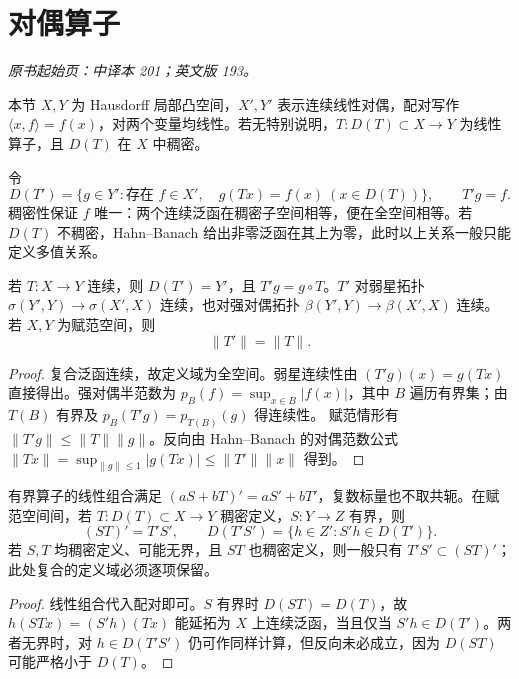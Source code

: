 \section{对偶算子}\label{sec:yosida-07-01}
\noindent\textit{原书起始页：中译本 201；英文版 193。}

本节 $X,Y$ 为 Hausdorff 局部凸空间，$X',Y'$ 表示连续线性对偶，配对写作 $\langle x,f\rangle=f(x)$，对两个变量均线性。若无特别说明，$T:D(T)\subset X\to Y$ 为线性算子，且 $D(T)$ 在 $X$ 中稠密。

\begin{definition}[对偶算子及其定义域]
令
\[
 D(T')=\{g\in Y':\text{存在 }f\in X',\quad g(Tx)=f(x)\ (x\in D(T))\},
 \qquad T'g=f.
\]
稠密性保证 $f$ 唯一：两个连续泛函在稠密子空间相等，便在全空间相等。若 $D(T)$ 不稠密，Hahn--Banach 给出非零泛函在其上为零，此时以上关系一般只能定义多值关系。
\end{definition}

\begin{proposition}[连续算子的转置]\label{prop:y7-transpose}
若 $T:X\to Y$ 连续，则 $D(T')=Y'$，且 $T'g=g\circ T$。$T'$ 对弱星拓扑 $\sigma(Y',Y)\to\sigma(X',X)$ 连续，也对强对偶拓扑 $\beta(Y',Y)\to\beta(X',X)$ 连续。若 $X,Y$ 为赋范空间，则
\[
 \|T'\|=\|T\|.
\]
\end{proposition}
\begin{proof}
复合泛函连续，故定义域为全空间。弱星连续性由 $(T'g)(x)=g(Tx)$ 直接得出。强对偶半范数为 $p_B(f)=\sup_{x\in B}|f(x)|$，其中 $B$ 遍历有界集；由 $T(B)$ 有界及 $p_B(T'g)=p_{T(B)}(g)$ 得连续性。
赋范情形有 $\|T'g\|\le\|T\|\|g\|$。反向由 Hahn--Banach 的对偶范数公式
$\|Tx\|=\sup_{\|g\|\le1}|g(Tx)|\le\|T'\|\|x\|$ 得到。
\end{proof}

\begin{proposition}[代数运算的定义域]
有界算子的线性组合满足 $(aS+bT)'=aS'+bT'$，复数标量也不取共轭。在赋范空间间，若 $T:D(T)\subset X\to Y$ 稠密定义，$S:Y\to Z$ 有界，则
\[
 (ST)'=T'S',\qquad D(T'S')=\{h\in Z':S'h\in D(T')\}.
\]
若 $S,T$ 均稠密定义、可能无界，且 $ST$ 也稠密定义，则一般只有 $T'S'\subset(ST)'$；此处复合的定义域必须逐项保留。
\end{proposition}
\begin{proof}
线性组合代入配对即可。$S$ 有界时 $D(ST)=D(T)$，故 $h(STx)=(S'h)(Tx)$ 能延拓为 $X$ 上连续泛函，当且仅当 $S'h\in D(T')$。两者无界时，对 $h\in D(T'S')$ 仍可作同样计算，但反向未必成立，因为 $D(ST)$ 可能严格小于 $D(T)$。
\end{proof}

